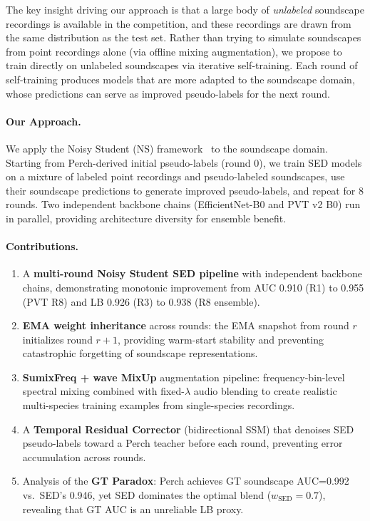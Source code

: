 \documentclass[journal]{IEEEtran}
\begin{document}
The key insight driving our approach is that a large body of \emph{unlabeled} soundscape recordings is available in the competition, and these recordings are drawn from the same distribution as the test set.
Rather than trying to simulate soundscapes from point recordings alone (via offline mixing augmentation), we propose to train directly on unlabeled soundscapes via iterative self-training.
Each round of self-training produces models that are more adapted to the soundscape domain, whose predictions can serve as improved pseudo-labels for the next round.

\paragraph{Our Approach.}
We apply the Noisy Student (NS) framework~\cite{xie2020self} to the soundscape domain.
Starting from Perch-derived initial pseudo-labels (round 0), we train SED models on a mixture of labeled point recordings and pseudo-labeled soundscapes, use their soundscape predictions to generate improved pseudo-labels, and repeat for 8 rounds.
Two independent backbone chains (EfficientNet-B0 and PVT v2 B0) run in parallel, providing architecture diversity for ensemble benefit.

\paragraph{Contributions.}
\begin{enumerate}
  \item A \textbf{multi-round Noisy Student SED pipeline} with independent backbone chains, demonstrating monotonic improvement from AUC 0.910 (R1) to 0.955 (PVT R8) and LB 0.926 (R3) to 0.938 (R8 ensemble).
  \item \textbf{EMA weight inheritance} across rounds: the EMA snapshot from round $r$ initializes round $r+1$, providing warm-start stability and preventing catastrophic forgetting of soundscape representations.
  \item \textbf{SumixFreq + wave MixUp} augmentation pipeline: frequency-bin-level spectral mixing combined with fixed-$\lambda$ audio blending to create realistic multi-species training examples from single-species recordings.
  \item A \textbf{Temporal Residual Corrector} (bidirectional SSM) that denoises SED pseudo-labels toward a Perch teacher before each round, preventing error accumulation across rounds.
  \item Analysis of the \textbf{GT Paradox}: Perch achieves GT soundscape AUC=0.992 vs.\ SED's 0.946, yet SED dominates the optimal blend ($w_\text{SED}=0.7$), revealing that GT AUC is an unreliable LB proxy.
\end{enumerate}
\end{document}
